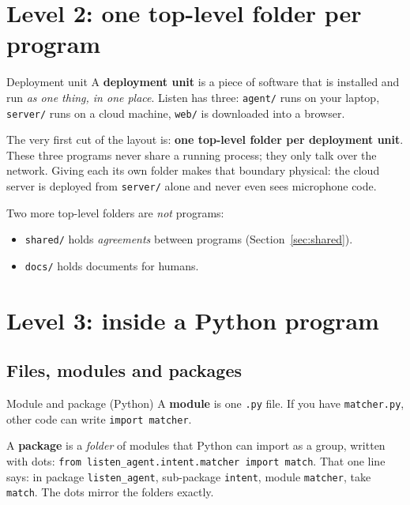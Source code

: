 \documentclass[11pt,a4paper]{article}
\begin{document}
\section{Level 2: one top-level folder per program}

\begin{concept}{Deployment unit}
A \textbf{deployment unit} is a piece of software that is installed and run \emph{as one
thing, in one place}. Listen has three:
\textcolor{local}{\texttt{agent/}} runs on your laptop,
\textcolor{cloud}{\texttt{server/}} runs on a cloud machine,
\textcolor{webc}{\texttt{web/}} is downloaded into a browser.
\end{concept}

The very first cut of the layout is: \textbf{one top-level folder per deployment unit}.
These three programs never share a running process; they only talk over the network. Giving
each its own folder makes that boundary physical: the cloud server is deployed from
\texttt{server/} alone and never even sees microphone code.

Two more top-level folders are \emph{not} programs:
\begin{itemize}[nosep]
  \item \texttt{shared/} holds \emph{agreements} between programs (Section~\ref{sec:shared}).
  \item \texttt{docs/} holds documents for humans.
\end{itemize}

\section{Level 3: inside a Python program}

\subsection{Files, modules and packages}
\begin{concept}{Module and package (Python)}
A \textbf{module} is one \texttt{.py} file. If you have \texttt{matcher.py}, other code can
write \texttt{import matcher}.

A \textbf{package} is a \emph{folder} of modules that Python can import as a group, written
with dots: \texttt{from listen\_agent.intent.matcher import match}. That one line says: in
package \texttt{listen\_agent}, sub-package \texttt{intent}, module \texttt{matcher}, take
\texttt{match}. The dots mirror the folders exactly.
\end{concept}
\end{document}
